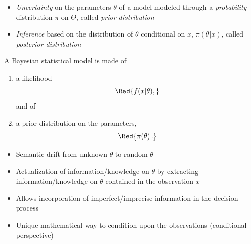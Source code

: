 \begin{slide}
\begin{itemize}
\item {\it Uncertainty} on the parameters $\theta$ of a model 
modeled through a {\it probability} distribution $\pi$ on $\Theta$, 
called {\it prior distribution}

\pause
\item {\it Inference} based on the distribution of $\theta$ conditional 
on $x$, $\pi(\theta|x)$, called {\it posterior distribution}
{\Brown{
\[
\pi(\theta|x) = {f(x|\theta) \pi(\theta) \over \int f(x|\theta) 
     \pi(\theta) \,d\theta}\ .
\]
}}
\end{itemize}

\end{slide}\begin{slide}

A Bayesian statistical model is made of 
\begin{enumerate}
\item a likelihood \[{\Red{ f(x|\theta), }}\]
\pause and of 
\item a prior distribution on the parameters, \[{\Red{ \pi(\theta)\,. }}\]
\end{enumerate}

\end{slide}\begin{slide}

\begin{itemize}
\item Semantic drift from unknown $\theta$ to random $\theta$
\pause
\item Actualization of information/knowledge on $\theta$ by extracting
      information/knowledge on $\theta$ contained in the observation $x$
\pause

\item Allows incorporation of imperfect/imprecise information in the decision process
\pause

\item Unique mathematical way to condition upon the observations 
     (conditional perspective) 
\end{itemize}

\end{slide}\begin{slide}
\debut[Normal illustration $(\sigma^2=1)$]


\end{slide}
